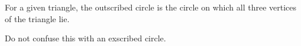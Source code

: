 For a given triangle, the outscribed circle is the circle on which all
three vertices of the triangle lie.
\par
Do not confuse this with an exscribed circle.
